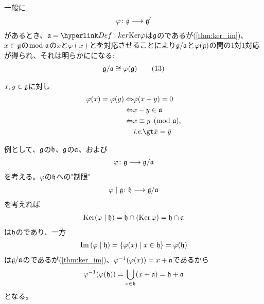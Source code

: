 \documentclass[fleqn,twocolumn,titlepage,dvipdfmx]{jsarticle}
\begin{document}
\begin{theorem}
  一般に{}
  \begin{align*}
    \varphi\colon\mathfrak{g}\longrightarrow\mathfrak{g}^{\prime}
  \end{align*}
  があるとき、$\a=\hlin{Def:ker}{\Ker}{\varphi}$は$\mathfrak{g}$の{}であるが(\cref{thm:ker_im})、
  $x\in\mathfrak{g}$の$\bmod{\;\mathfrak{a}}$の{}$\bar{x}$と$\varphi(x)$とを対応させることにより$\mathfrak{g}/\mathfrak{a}$と$\varphi(\mathfrak{g})$の間の1対1対応が得られ、それは明らかに{}になる:
  \begin{align*}
    \mathfrak{g}/\mathfrak{a}\cong\varphi(\mathfrak{g})\tag{13}\label{eq:2_(13)}
  \end{align*}
\end{theorem}
\begin{Proof}
  $x,y\in\mathfrak{g}$に対し
  \begin{align*}
    \varphi(x)=\varphi(y) 
    \Leftrightarrow& \varphi(x-y)=0\\
    \Leftrightarrow& x-y\in\a\\
    \Leftrightarrow& x\equiv y \pmod{\a},\\
    &\ie\bar{x}=\bar{y}
  \end{align*}
\end{Proof}

\begin{remark}
  例として、$\mathfrak{g}$の{}$\mathfrak{h}$、$\mathfrak{g}$の{}$\mathfrak{a}$、および{}
  \begin{align*}
    \varphi\colon\mathfrak{g}\longrightarrow\mathfrak{g}/\mathfrak{a}
  \end{align*}
  を考える。$\varphi$の$\mathfrak{h}$への"制限"
  \begin{align*}
    \varphi\mid\mathfrak{g}\colon \mathfrak{h}\longrightarrow\mathfrak{g}/\mathfrak{a}
  \end{align*}
  を考えれば
  \begin{align*}
    \operatorname{Ker}(\varphi\mid\mathfrak{h})=\mathfrak{h}\cap\qty(\operatorname{Ker}\varphi)=\mathfrak{h}\cap\mathfrak{a}
  \end{align*}
  は$\mathfrak{h}$の{}であり、一方
  \begin{align*}
    \Im\qty(\varphi\mid\mathfrak{h})=\qty{\varphi(x)\mid x\in\mathfrak{h}}=\varphi(\mathfrak{h})
  \end{align*}
  は$\mathfrak{g}/\mathfrak{a}$の{}であるが(\cref{thm:ker_im})、$\varphi^{-1}(\varphi(x))=x+\mathfrak{a}$であるから
  \begin{align*}
    \varphi^{-1}\qty(\varphi(\mathfrak{h}))=\bigcup_{x\in\mathfrak{h}}(x+\mathfrak{a})=\mathfrak{h}+\mathfrak{a}
  \end{align*}
  となる。
\end{remark}


\end{document}
